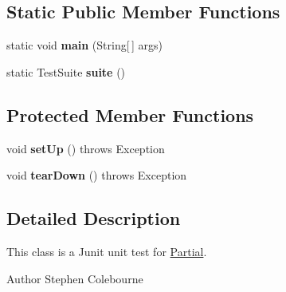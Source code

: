 \subsection*{Static Public Member Functions}
\begin{DoxyCompactItemize}
\item 
\hypertarget{classorg_1_1joda_1_1time_1_1_test_partial___constructors_a114dc781e7d438b7c526ca2ddfdef18b}{static void {\bfseries main} (String\mbox{[}$\,$\mbox{]} args)}\label{classorg_1_1joda_1_1time_1_1_test_partial___constructors_a114dc781e7d438b7c526ca2ddfdef18b}

\item 
\hypertarget{classorg_1_1joda_1_1time_1_1_test_partial___constructors_aa0a8e97c67abba1661d468c12ea7e12a}{static Test\-Suite {\bfseries suite} ()}\label{classorg_1_1joda_1_1time_1_1_test_partial___constructors_aa0a8e97c67abba1661d468c12ea7e12a}

\end{DoxyCompactItemize}
\subsection*{Protected Member Functions}
\begin{DoxyCompactItemize}
\item 
\hypertarget{classorg_1_1joda_1_1time_1_1_test_partial___constructors_adec368e1fbcdbe23586f5fcec21e6914}{void {\bfseries set\-Up} ()  throws Exception }\label{classorg_1_1joda_1_1time_1_1_test_partial___constructors_adec368e1fbcdbe23586f5fcec21e6914}

\item 
\hypertarget{classorg_1_1joda_1_1time_1_1_test_partial___constructors_a98ccd886a36b228ad8ffbfae5686cf1f}{void {\bfseries tear\-Down} ()  throws Exception }\label{classorg_1_1joda_1_1time_1_1_test_partial___constructors_a98ccd886a36b228ad8ffbfae5686cf1f}

\end{DoxyCompactItemize}


\subsection{Detailed Description}
This class is a Junit unit test for \hyperlink{classorg_1_1joda_1_1time_1_1_partial}{Partial}.

\begin{DoxyAuthor}{Author}
Stephen Colebourne 
\end{DoxyAuthor}


